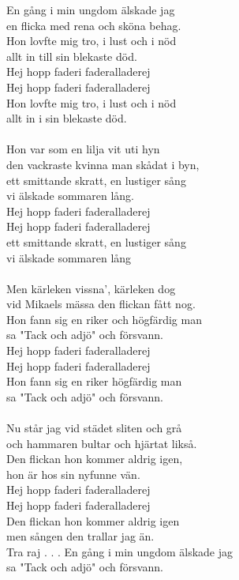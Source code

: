 \vspace{10pt}
En gång i min ungdom älskade jag\\
en flicka med rena och sköna behag.\\
Hon lovfte mig tro, i lust och i nöd\\
allt in till sin blekaste död.\\
Hej hopp faderi faderalladerej\\
Hej hopp faderi faderalladerej\\
Hon lovfte mig tro, i lust och i nöd\\
allt in i sin blekaste död.\\
\\
Hon var som en lilja vit uti hyn\\
den vackraste kvinna man skådat i byn,\\
ett smittande skratt, en lustiger sång\\
vi älskade sommaren lång.\\
Hej hopp faderi faderalladerej\\
Hej hopp faderi faderalladerej\\
ett smittande skratt, en lustiger sång\\
vi älskade sommaren lång\\
\\
Men kärleken vissna', kärleken dog\\
vid Mikaels mässa den flickan fått nog.\\
Hon fann sig en riker och högfärdig man\\
sa "Tack och adjö" och försvann.\\
Hej hopp faderi faderalladerej\\
Hej hopp faderi faderalladerej\\
Hon fann sig en riker högfärdig man\\
sa "Tack och adjö" och försvann.\\
\\
Nu står jag vid städet sliten och grå\\
och hammaren bultar och hjärtat likså.\\
Den flickan hon kommer aldrig igen,\\
hon är hos sin nyfunne vän.\\
Hej hopp faderi faderalladerej\\
Hej hopp faderi faderalladerej\\
Den flickan hon kommer aldrig igen\\
men sången den trallar jag än.\\
Tra raj . . .
\vspace{15pt}
\vspace{10pt}
En gång i min ungdom älskade jag\\
sa "Tack och adjö" och försvann.

